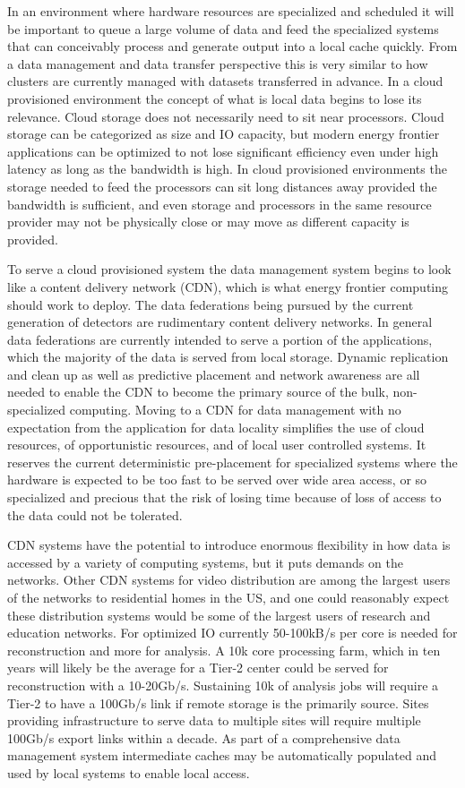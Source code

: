 In an environment where hardware resources are specialized and
scheduled it will be important to queue a large volume of data and
feed the specialized systems that can conceivably process and generate
output into a local cache quickly.  From a data management and data
transfer perspective this is very similar to how clusters are
currently managed with datasets transferred in advance.  In a cloud
provisioned environment the concept of what is local data begins to
lose its relevance.  Cloud storage does not necessarily need to sit
near processors.  Cloud storage can be categorized as size and IO
capacity, but modern energy frontier applications can be optimized to
not lose significant efficiency even under high latency as long as the
bandwidth is high.  In cloud provisioned environments the storage
needed to feed the processors can sit long distances away provided the
bandwidth is sufficient, and even storage and processors in the same
resource provider may not be physically close or may move as different
capacity is provided.

To serve a cloud provisioned system the data management system begins
to look like a content delivery network (CDN), which is what energy
frontier computing should work to deploy.  The data federations being
pursued by the current generation of detectors are rudimentary content
delivery networks.  In general data federations are currently intended
to serve a portion of the applications, which the majority of the data
is served from local storage.  Dynamic replication and clean up as
well as predictive placement and network awareness are all needed to
enable the CDN to become the primary source of the bulk,
non-specialized computing.  Moving to a CDN for data management with
no expectation from the application for data locality simplifies the
use of cloud resources, of opportunistic resources, and of local user
controlled systems.  It reserves the current deterministic
pre-placement for specialized systems where the hardware is expected
to be too fast to be served over wide area access, or so specialized
and precious that the risk of losing time because of loss of access to
the data could not be tolerated.

CDN systems have the potential to introduce enormous flexibility in
how data is accessed by a variety of computing systems, but it puts
demands on the networks.  Other CDN systems for video distribution are
among the largest users of the networks to residential homes in the
US, and one could reasonably expect these distribution systems would
be some of the largest users of research and education networks.  For
optimized IO currently 50-100kB/s per core is needed for
reconstruction and more for analysis.  A 10k core processing farm,
which in ten years will likely be the average for a Tier-2 center
could be served for reconstruction with a 10-20Gb/s.  Sustaining 10k
of analysis jobs will require a Tier-2 to have a 100Gb/s link if
remote storage is the primarily source.  Sites providing
infrastructure to serve data to multiple sites will require multiple
100Gb/s export links within a decade.  As part of a comprehensive data
management system intermediate caches may be automatically populated
and used by local systems to enable local access.

